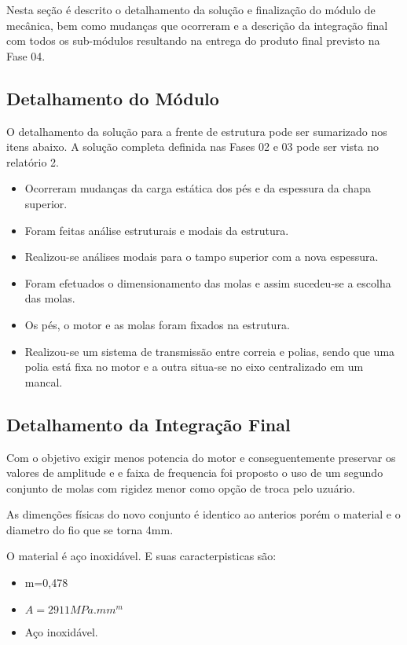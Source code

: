 \label{desenvolvimento_estrutura}

Nesta seção é descrito o detalhamento da solução e finalização do módulo de mecânica, bem como mudanças que ocorreram e a descrição da integração final com todos os sub-módulos resultando na entrega do produto final previsto na Fase 04.

\subsection{Detalhamento do Módulo}

  O detalhamento da solução para a frente de estrutura pode ser sumarizado nos itens abaixo. A solução completa definida nas Fases 02 e 03 pode ser vista no relatório 2.

    \begin{itemize}
    \item Ocorreram mudanças da carga estática dos pés e da espessura da chapa superior.
    \item Foram feitas análise estruturais e modais da estrutura.
    \item Realizou-se análises modais para o tampo superior com a nova espessura.
    \item Foram efetuados o dimensionamento das molas e assim sucedeu-se a escolha das molas.
    \item Os pés, o motor e as molas foram fixados na estrutura.
    \item Realizou-se um sistema de transmissão entre correia e polias, sendo que uma polia está fixa no motor e a outra situa-se no eixo centralizado em um mancal.
    \end{itemize}

\subsection{Detalhamento da Integração Final}

Com o objetivo exigir menos potencia do motor e conseguentemente preservar os valores de amplitude e e faixa de frequencia foi proposto o uso de um segundo conjunto de molas com rigidez menor como opção de troca pelo uzuário.

As dimenções físicas do novo conjunto é identico ao anterios porém o material e o diametro do fio que se torna 4mm.

O material é aço inoxidável. E suas caracterpisticas são:

\begin{itemize}
\item m=0,478
\item $A=2911 MPa.mm^m$
\item Aço inoxidável.
\end{itemize}

